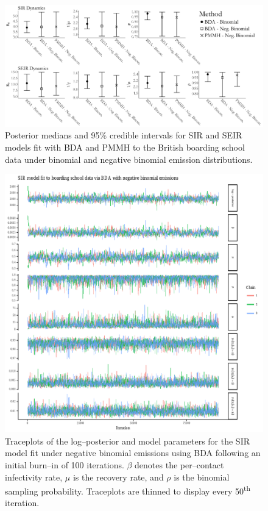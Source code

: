 \begin{figure}[htbp]
	\centering
	\includegraphics[width=\linewidth]{figures/bbs_negbinom_credint_comp.pdf}
	\caption{Posterior medians and 95\% credible intervals for SIR and SEIR models fit with BDA and PMMH to the British boarding school data under binomial and negative binomial emission distributions.}
	\label{fig:bbs_negbinom_credint_comp}
\end{figure}


\begin{figure}[htbp]
	\centering
	\includegraphics[width=\linewidth]{figures/bbs_sir_bda_negbinom_traceplots.pdf}
	\caption{Traceplots of the log--posterior and model parameters for the SIR model fit under negative binomial emissions using BDA following an initial burn--in of 100 iterations. $ \beta $ denotes the per--contact infectivity rate, $ \mu $ is the recovery rate, and $ \rho $ is the binomial sampling probability. Traceplots are thinned to display every 50\textsuperscript{th} iteration.}
	\label{fig:bbs_sir_bda_negbinom_traceplots}
\end{figure}

